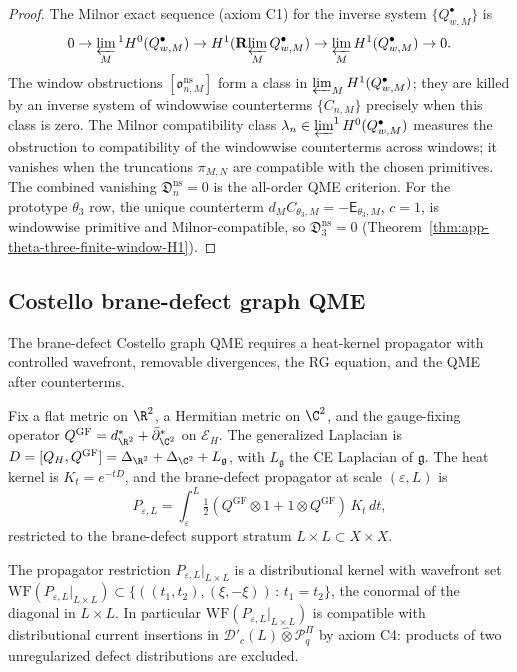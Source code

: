 \begin{proof}
The Milnor exact sequence (axiom C1) for the inverse system
\(\{Q^\bullet_{w,M}\}\) is
\[
  0\to\varprojlim_M{}^1 H^0(Q^\bullet_{w,M})
   \to H^1(\mathbf R\!\varprojlim_M Q^\bullet_{w,M})
   \to\varprojlim_M H^1(Q^\bullet_{w,M})
   \to 0.
\]
The window obstructions \([\mathfrak o^{\mathrm{ns}}_{n,M}]\)
form a class in
\(\varprojlim_M H^1(Q^\bullet_{w,M})\); they are killed by an
inverse system of windowwise counterterms
\(\{C_{n,M}\}\) precisely when this class is zero.  The Milnor
compatibility class \(\lambda_n\in
\varprojlim^1 H^0(Q^\bullet_{w,M})\) measures the obstruction to
compatibility of the windowwise counterterms across windows; it
vanishes when the truncations \(\pi_{M,N}\) are compatible with
the chosen primitives.  The combined vanishing
\(\mathfrak D^{\mathrm{ns}}_n=0\) is the all-order QME criterion.
For the prototype \(\theta_3\) row, the unique counterterm
\(d_M C_{\theta_3,M}=-\mathsf E_{\theta_3,M}\), \(c=1\), is
windowwise primitive and Milnor-compatible, so
\(\mathfrak D^{\mathrm{ns}}_3=0\)
(Theorem~\ref{thm:app-theta-three-finite-window-H1}).
\end{proof}

\subsection{Costello brane-defect graph QME}
\label{ssec:completion-graph-qme}

The brane-defect Costello graph QME requires a heat-kernel
propagator with controlled wavefront, removable divergences, the
RG equation, and the QME after counterterms.

\begin{defn}
\label{def:completion-brane-defect-propagator}
Fix a flat metric on \(\R^2\), a Hermitian metric on \(\C^2\), and
the gauge-fixing operator
\(Q^{\mathrm{GF}}=d^*_{\R^2}+\bar\partial^*_{\C^2}\) on
\(\mathcal E_H\).  The generalized Laplacian is
\(D=[Q_H,Q^{\mathrm{GF}}]=\Delta_{\R^2}+\Delta_{\C^2}+L_{\mathfrak g}\),
with \(L_{\mathfrak g}\) the CE Laplacian of \(\mathfrak g\).  The
heat kernel is \(K_t=e^{-tD}\), and the brane-defect propagator at
scale \((\varepsilon,L)\) is
\[
  P_{\varepsilon,L}=\int_\varepsilon^L
   \tfrac12(Q^{\mathrm{GF}}\otimes 1+1\otimes Q^{\mathrm{GF}})\,
   K_t\,dt,
\]
restricted to the brane-defect support stratum
\(L\times L\subset X\times X\).
\end{defn}

\begin{thm}
\label{thm:completion-wavefront-control}
The propagator restriction \(P_{\varepsilon,L}|_{L\times L}\) is a
distributional kernel with wavefront set
\(\mathrm{WF}(P_{\varepsilon,L}|_{L\times L})\subset
\{((t_1,t_2),(\xi,-\xi))\,:\,t_1=t_2\}\), the conormal of the
diagonal in \(L\times L\).  In particular
\(\mathrm{WF}(P_{\varepsilon,L}|_{L\times L})\) is compatible with
distributional current insertions in
\(\mathcal D'_c(L)\widehat\otimes\mathcal P^\Pi_q\) by axiom C4: products
of two unregularized defect distributions are excluded.
\end{thm}

